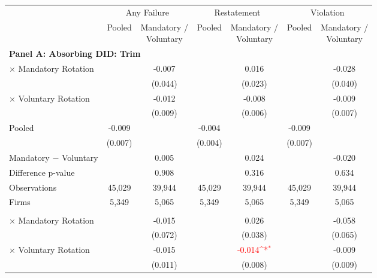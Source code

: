 \documentclass[10pt]{article}
\newcommand{\sym}[1]{\textsuperscript{#1}}
\begin{document}
\begin{minipage}{19cm}\fontsize{10}{12}\selectfont\setlength{\tabcolsep}{4pt}\renewcommand{\arraystretch}{1.12}


\def\sym#1{\ifmmode^{#1}\else\(^{#1}\)\fi}
\centering
{}
\label{tab:absorbing-transition-school-985-downgrade-no-auditfirm-fe}
\begin{threeparttable}

\begin{tabular}{l cc cc cc}
\toprule
 & \multicolumn{2}{c}{Any Failure} & \multicolumn{2}{c}{Restatement} & \multicolumn{2}{c}{Violation} \\
\cmidrule(lr){2-3}\cmidrule(lr){4-5}\cmidrule(lr){6-7}
 & Pooled & \shortstack{Mandatory /\\Voluntary} & Pooled & \shortstack{Mandatory /\\Voluntary} & Pooled & \shortstack{Mandatory /\\Voluntary} \\
\midrule
\multicolumn{7}{l}{\textbf{Panel A: Absorbing DID: Trim}} \\
$\times$ Mandatory Rotation &  & -0.007 &  & 0.016 &  & -0.028 \\
 &  & (0.044) &  & (0.023) &  & (0.040) \\
$\times$ Voluntary Rotation &  & -0.012 &  & -0.008 &  & -0.009 \\
 &  & (0.009) &  & (0.006) &  & (0.007) \\
Pooled & -0.009 &  & -0.004 &  & -0.009 &  \\
 & (0.007) &  & (0.004) &  & (0.007) &  \\
Mandatory $-$ Voluntary &  & 0.005 &  & 0.024 &  & -0.020 \\
Difference p-value &  & 0.908 &  & 0.316 &  & 0.634 \\
Observations & 45,029 & 39,944 & 45,029 & 39,944 & 45,029 & 39,944 \\
Firms & 5,349 & 5,065 & 5,349 & 5,065 & 5,349 & 5,065 \\
\addlinespace
\multicolumn{7}{l}{\textbf{Panel B: Absorbing DID: Strict}} \\
$\times$ Mandatory Rotation &  & -0.015 &  & 0.026 &  & -0.058 \\
 &  & (0.072) &  & (0.038) &  & (0.065) \\
$\times$ Voluntary Rotation &  & -0.015 &  & \textcolor{red}{-0.014\sym{*}} &  & -0.009 \\
 &  & (0.011) &  & (0.008) &  & (0.009) \\

\end{tabular}
\end{threeparttable}
\end{minipage}
\end{document}

